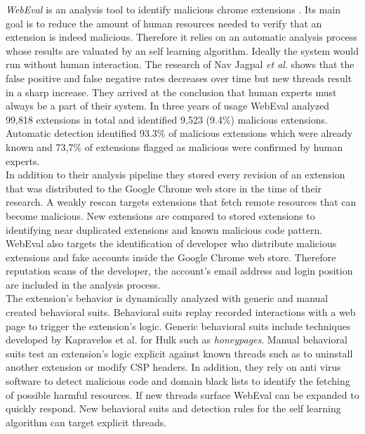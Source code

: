 \documentclass[article,colorback,accentcolor=tud9c,type=bsc]{tudthesis}
\begin{document}
	\textit{WebEval} is an analysis tool to identify malicious chrome extensions \cite{190984}. Its main goal is to reduce the amount of human resources needed to verify that an extension is indeed malicious. Therefore it relies on an automatic analysis process whose results are valuated by an self learning algorithm. Ideally the system would run without human interaction. The research of Nav Jagpal \textit{et al}. shows that the false positive and false negative rates decreases over time but new threads result in a sharp increase. They arrived at the conclusion that human experts must always be a part of their system. In three years of usage WebEval analyzed 99,818 extensions in total and identified 9,523 (9.4\%) malicious extensions. Automatic detection identified 93.3\% of malicious extensions which were already known and 73,7\% of extensions flagged as malicious were confirmed by human experts. \\
	In addition to their analysis pipeline they stored every revision of an extension that was distributed to the Google Chrome web store in the time of their research. A weakly rescan targets extensions that fetch remote resources that can become malicious. New extensions are compared to stored extensions to identifying near duplicated extensions and known malicious code pattern. WebEval also targets the identification of developer who distribute malicious extensions and fake accounts inside the Google Chrome web store. Therefore reputation scans of the developer, the account's email address and login position are included in the analysis process.  \\
	The extension's behavior is dynamically analyzed with generic and manual created behavioral suits. Behavioral suits replay recorded interactions with a web page to trigger the extension's logic. Generic behavioral suits include techniques developed by Kapravelos	et al. for Hulk \cite{184485} such as \textit{honeypages}. Manual behavioral suits test an extension's logic explicit against known threads such as to uninstall another extension or modify CSP headers. In addition, they rely on anti virus software to detect malicious code and domain black lists to identify the fetching of possible harmful resources. If new threads surface WebEval can be expanded to quickly respond. New behavioral suits and detection rules for the self learning algorithm can target explicit threads. \\
	
\end{document}
